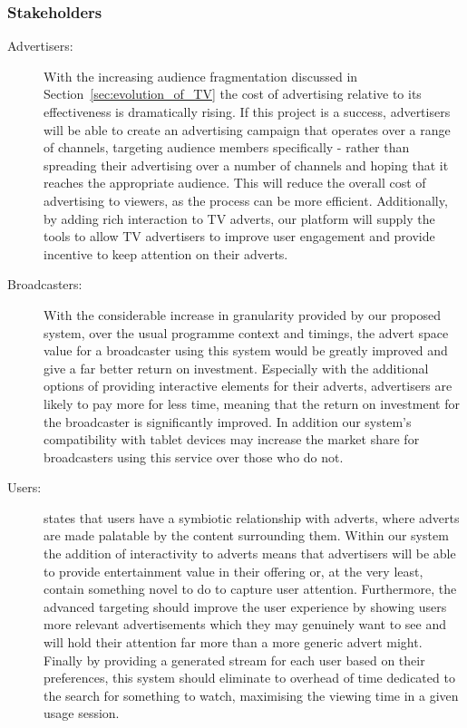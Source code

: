 \subsubsection{Stakeholders}
\begin{description}
\item[Advertisers:]{With the increasing audience fragmentation discussed in Section~\ref{sec:evolution_of_TV} the cost of advertising relative to its effectiveness is dramatically rising. If this project is a success, advertisers will be able to create an advertising campaign that operates over a range of channels, targeting audience members specifically - rather than spreading their advertising over a number of channels and hoping that it reaches the appropriate audience. This will reduce the overall cost of advertising to viewers, as the process can be more efficient. Additionally, by adding rich interaction to TV adverts, our platform will supply the tools to allow TV advertisers to improve user engagement and provide incentive to keep attention on their adverts.}
\item[Broadcasters:]{With the considerable increase in granularity provided by our proposed system, over the usual programme context and timings, the advert space value for a broadcaster using this system would be greatly improved and give a far better return on investment. Especially with the additional options of providing interactive elements for their adverts, advertisers are likely to pay more for less time, meaning that the return on investment for the broadcaster is significantly improved. In addition our system's compatibility with tablet devices may increase the market share for broadcasters using this service over those who do not.}
\item[Users:]{\citet{broadcastEconomics} states that users have a symbiotic relationship with adverts, where adverts are made palatable by the content surrounding them. Within our system the addition of interactivity to adverts means that advertisers will be able to provide entertainment value in their offering or, at the very least, contain something novel to do to capture user attention. Furthermore, the advanced targeting should improve the user experience by showing users more relevant advertisements which they may genuinely want to see and will hold their attention far more than a more generic advert might. Finally by providing a generated stream for each user based on their preferences, this system should eliminate to overhead of time dedicated to the search for something to watch, maximising the viewing time in a given usage session.}

\end{description}
